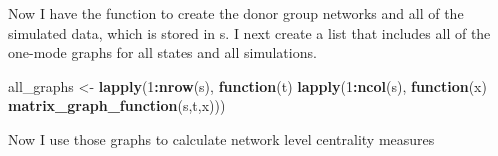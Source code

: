 \documentclass[]{article}
\newenvironment{Shaded}{\begin{snugshade}}{\end{snugshade}}
\newcommand{\KeywordTok}[1]{\textcolor[rgb]{0.13,0.29,0.53}{\textbf{#1}}}
\newcommand{\DecValTok}[1]{\textcolor[rgb]{0.00,0.00,0.81}{#1}}
\newcommand{\StringTok}[1]{\textcolor[rgb]{0.31,0.60,0.02}{#1}}
\newcommand{\ControlFlowTok}[1]{\textcolor[rgb]{0.13,0.29,0.53}{\textbf{#1}}}
\newcommand{\OperatorTok}[1]{\textcolor[rgb]{0.81,0.36,0.00}{\textbf{#1}}}
\newcommand{\NormalTok}[1]{#1}
\begin{document}
Now I have the function to create the donor group networks and all of
the simulated data, which is stored in s. I next create a list that
includes all of the one-mode graphs for all states and all simulations.

\begin{Shaded}
\begin{Highlighting}[]
\NormalTok{all_graphs <-}\StringTok{ }\KeywordTok{lapply}\NormalTok{(}\DecValTok{1}\OperatorTok{:}\KeywordTok{nrow}\NormalTok{(s), }\ControlFlowTok{function}\NormalTok{(t) }\KeywordTok{lapply}\NormalTok{(}\DecValTok{1}\OperatorTok{:}\KeywordTok{ncol}\NormalTok{(s), }\ControlFlowTok{function}\NormalTok{(x) }\KeywordTok{matrix_graph_function}\NormalTok{(s,t,x)))}
\end{Highlighting}
\end{Shaded}

Now I use those graphs to calculate network level centrality measures
\end{document}
